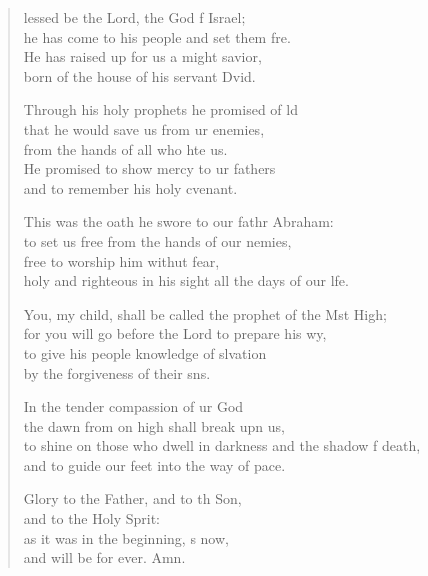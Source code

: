 \settowidth{\versewidth}{to shine on those who dwell in darkness and the shadow of death, *}
\begin{verse}%
  \begin{patverse}
lessed be the Lord, the God f Israel;\Med\\
he has come to his people and set them fre.\\
He has raised up for us a might savior,\Med\\
born of the house of his servant Dvid.

Through his holy prophets he promised of ld\Flex\\
that he would save us from ur enemies,\Med\\
from the hands of all who hte us.\\
He promised to show mercy to ur fathers\Med\\
and to remember his holy cvenant.

This was the oath he swore to our fathr Abraham:\Med\\
to set us free from the hands of our nemies,\\
free to worship him withut fear,\Med\\
holy and righteous in his sight all the days of our l\pointup{\i}fe.

You, my child, shall be called the prophet of the Mst High;\Med\\
for you will go before the Lord to prepare his wy,\\
to give his people knowledge of slvation\Med\\
by the forgiveness of their s\pointup{\i}ns.

In the tender compassion of ur God\Med\\
the dawn from on high shall break upn us,\\
to shine on those who dwell in darkness and the shadow f death,\Med\\
and to guide our feet into the way of pace.

Glory to the Father, and to th Son,\Med\\
and to the Holy Sp\pointup{\i}rit:\\
as it was in the beginning, \pointup{\i}s now,\Med\\
and will be for ever. Amn.
  \end{patverse}
  \end{verse}
